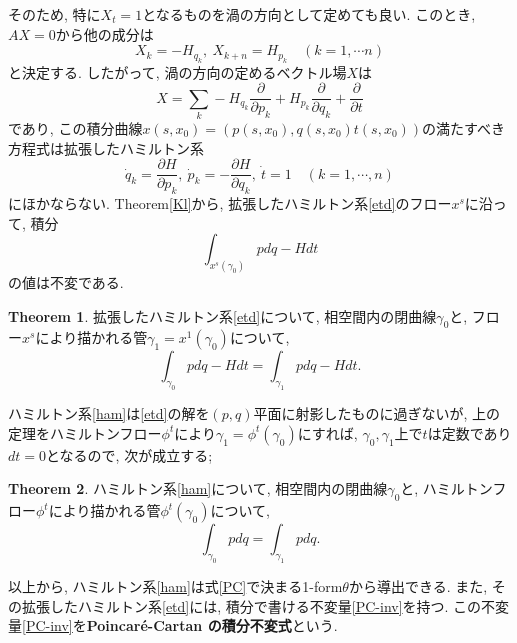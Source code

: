 \documentclass[a4paper]{ujarticle}
\numberwithin{equation}{section}
\theoremstyle{definition}
\newtheorem{theorem}{Theorem}
\begin{document}
    そのため, 特に$X_t = 1$となるものを渦の方向として定めても良い. このとき, $AX = 0$から他の成分は
    \[
        X_k = - H_{q_k}, \ X_{k+n} = H_{p_k} \quad (k = 1, \cdots n)
    \]
    と決定する.
    したがって, 渦の方向の定めるベクトル場$X$は
    \[
        X = \sum_{k} - H_{q_k} \frac{\partial}{\partial p_k} +  H_{p_k} \frac{\partial}{\partial q_k} + \frac{\partial}{\partial t}
    \]
    であり, この積分曲線$x(s, x_0) = (p(s, x_0), q(s, x_0) t(s, x_0))$の満たすべき方程式は拡張したハミルトン系
    \begin{equation} \label{etd}
        \dot{q}_k = \frac{\partial H}{\partial p_k}, \ \dot{p}_k = -\frac{\partial H}{\partial q_k},\  \dot{t} = 1 \quad (k = 1, \cdots, n)
    \end{equation}
    にほかならない. 
    Theorem\ref{Kl}から, 拡張したハミルトン系\eqref{etd}のフロー$x^s$に沿って, 積分
    \begin{equation} \label{PC-inv}
        \int_{x^{s}(\gamma_0)} p dq - H dt
    \end{equation}
    の値は不変である. 
    \begin{theorem} \label{PC-etd}
        拡張したハミルトン系\eqref{etd}について, 
        相空間内の閉曲線$\gamma_0$と, フロー$x^{s}$により描かれる管$\gamma_1 = x^{1}(\gamma_0)$について,
        \begin{equation} \label{eq:PC-inv}
            \int_{\gamma_0} p dq - H dt = \int_{\gamma_1} p dq - H dt.
        \end{equation}
    \end{theorem}
    ハミルトン系\eqref{ham}は\eqref{etd}の解を$(p, q)$平面に射影したものに過ぎないが, 
    上の定理をハミルトンフロー$\phi^{t}$により$\gamma_1 = \phi^{t}(\gamma_0)$にすれば, 
    $\gamma_0, \gamma_1$上で$t$は定数であり$dt = 0$となるので, 次が成立する;
    \begin{theorem} \label{PC-ham}
        ハミルトン系\eqref{ham}について, 
        相空間内の閉曲線$\gamma_0$と, ハミルトンフロー$\phi^{t}$により描かれる管$\phi^{t}(\gamma_0)$について,
        \begin{equation} \label{eq:P-inv}
            \int_{\gamma_0} p dq = \int_{\gamma_1} p dq.
        \end{equation}
    \end{theorem}
    
    以上から, ハミルトン系\eqref{ham}は式\eqref{PC}で決まる1-form$\theta$から導出できる.
    また, その拡張したハミルトン系\eqref{etd}には, 積分で書ける不変量\eqref{PC-inv}を持つ.
    この不変量\eqref{PC-inv}を\textbf{Poincar\'{e}-Cartan の積分不変式}という.
\end{document}
